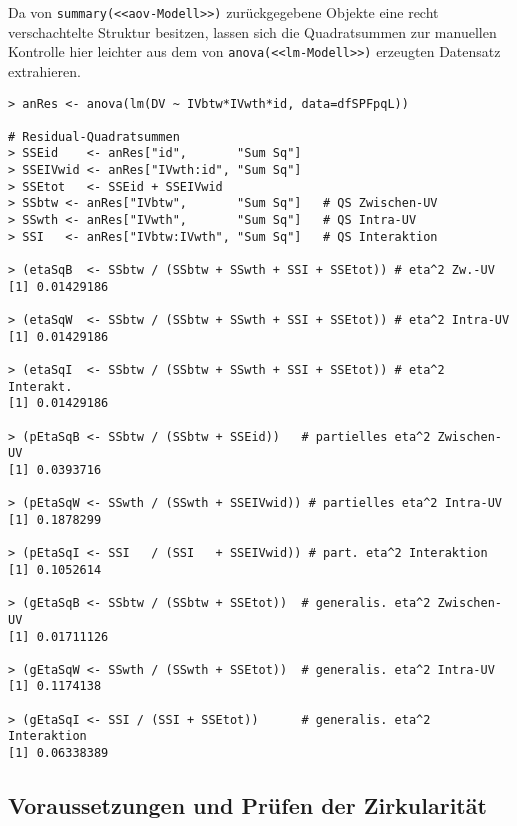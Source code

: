Da von \lstinline!summary(<<aov-Modell>>)! zurückgegebene Objekte eine recht verschachtelte Struktur besitzen, lassen sich die Quadratsummen zur manuellen Kontrolle hier leichter aus dem von \lstinline!anova(<<lm-Modell>>)! erzeugten Datensatz extrahieren.
\begin{lstlisting}
> anRes <- anova(lm(DV ~ IVbtw*IVwth*id, data=dfSPFpqL))

# Residual-Quadratsummen
> SSEid    <- anRes["id",       "Sum Sq"]
> SSEIVwid <- anRes["IVwth:id", "Sum Sq"]
> SSEtot   <- SSEid + SSEIVwid
> SSbtw <- anRes["IVbtw",       "Sum Sq"]   # QS Zwischen-UV
> SSwth <- anRes["IVwth",       "Sum Sq"]   # QS Intra-UV
> SSI   <- anRes["IVbtw:IVwth", "Sum Sq"]   # QS Interaktion

> (etaSqB  <- SSbtw / (SSbtw + SSwth + SSI + SSEtot)) # eta^2 Zw.-UV
[1] 0.01429186

> (etaSqW  <- SSbtw / (SSbtw + SSwth + SSI + SSEtot)) # eta^2 Intra-UV
[1] 0.01429186

> (etaSqI  <- SSbtw / (SSbtw + SSwth + SSI + SSEtot)) # eta^2 Interakt.
[1] 0.01429186

> (pEtaSqB <- SSbtw / (SSbtw + SSEid))   # partielles eta^2 Zwischen-UV
[1] 0.0393716

> (pEtaSqW <- SSwth / (SSwth + SSEIVwid)) # partielles eta^2 Intra-UV
[1] 0.1878299

> (pEtaSqI <- SSI   / (SSI   + SSEIVwid)) # part. eta^2 Interaktion
[1] 0.1052614

> (gEtaSqB <- SSbtw / (SSbtw + SSEtot))  # generalis. eta^2 Zwischen-UV
[1] 0.01711126

> (gEtaSqW <- SSwth / (SSwth + SSEtot))  # generalis. eta^2 Intra-UV
[1] 0.1174138

> (gEtaSqI <- SSI / (SSI + SSEtot))      # generalis. eta^2 Interaktion
[1] 0.06338389
\end{lstlisting}

\subsection{Voraussetzungen und Prüfen der Zirkularität}

